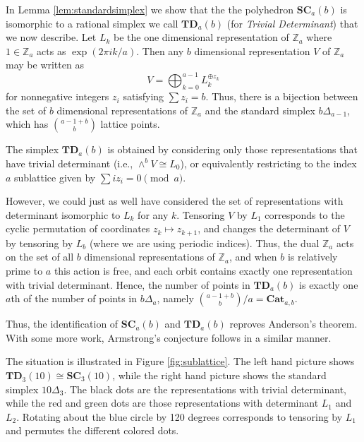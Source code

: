 \documentclass{amsart}[12pt]
\theoremstyle{definition}
\newcommand{\Z}{\mathbb{Z}}
\newcommand{\SC}{\mathbf{SC}}
\newcommand{\TD}{\mathbf{TD}}
\newcommand{\Cat}{\mathbf{Cat}}
\begin{document}
\subsubsection{}

In Lemma \ref{lem:standardsimplex} we show that the the polyhedron $\SC_a(b)$ is isomorphic to a rational simplex we call $\TD_a(b)$ (for \emph{Trivial Determinant}) that we now describe.  Let $L_k$ be the one dimensional representation of $\Z_a$ where $1\in \Z_a$ acts as $\exp(2\pi ik/a)$.  Then any $b$ dimensional representation $V$ of $\Z_a$ may be written as
$$V=\bigoplus_{k=0}^{a-1} L_k^{\oplus z_k}$$
for nonnegative integers $z_i$ satisfying $\sum z_i=b$.  Thus, there is a bijection between the set of $b$ dimensional representations of $\Z_a$ and the standard simplex $b\Delta_{a-1}$, which has $\binom{a-1+b}{b}$ lattice points.

The simplex $\TD_a(b)$ is obtained by considering only those representations that have trivial determinant (i.e., $\wedge^b V\cong L_0$), or equivalently restricting to the index $a$ sublattice given by $\sum iz_i=0\pmod a$.

However, we could just as well have considered the set of representations with determinant isomorphic to $L_k$ for any $k$.  Tensoring $V$ by $L_1$ corresponds to the cyclic permutation of coordinates $z_k\mapsto z_{k+1}$, and changes the determinant of $V$ by tensoring by $L_b$ (where we are using periodic indices).  Thus, the dual $\Z_a$ acts on the set of all $b$ dimensional representations of $\Z_a$, and when $b$ is relatively prime to $a$ this action is free, and each orbit contains exactly one representation with trivial determinant.  Hence, the number of points in $\TD_a(b)$ is exactly one $a$th of the number of points in $b\Delta_a$, namely $\binom{a-1+b}{b}/a=\Cat_{a,b}$.  

Thus, the identification of $\SC_a(b)$ and $\TD_a(b)$ reproves Anderson's theorem.  With some more work, Armstrong's conjecture follows in a similar manner.

The situation is illustrated in Figure \ref{fig:sublattice}.  The left hand picture shows $\TD_3(10)\cong \SC_3(10)$, while the right hand picture shows the standard simplex $10\Delta_3$.   The black dots are the representations with trivial determinant, while the red and green dots are those representations with determinant $L_1$ and $L_2$.  Rotating about the blue circle by 120 degrees corresponds to tensoring by $L_1$ and permutes the different colored dots.
\end{document}
